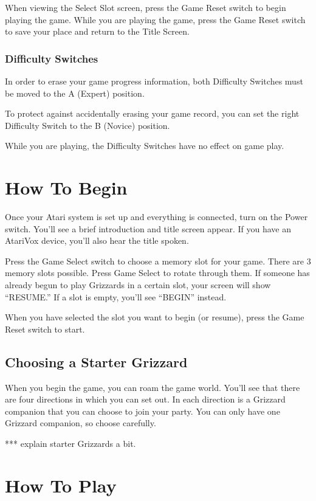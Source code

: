 \documentclass[10pt,twoside,openright]{memoir}
\begin{document}
When viewing  the Select  Slot screen,  press the  Game Reset  switch to
begin playing the  game. While you are playing the  game, press the Game
Reset switch to save your place and return to the Title Screen.

\subsection{Difficulty Switches}

In order to erase your game progress information, both Difficulty
Switches must be moved to the A (Expert) position.

To protect  against accidentally erasing  your game record, you  can set
the right Difficulty Switch to the B (Novice) position.

While  you  are playing,  the  Difficulty  Switches  have no  effect  on
game play. 

\chapter{How To Begin}

Once your Atari system is set up and everything is connected, turn on the
Power switch. You'll see a brief introduction and title screen appear. If
you have an AtariVox device, you'll also hear the title spoken.

Press the Game Select switch to choose a memory slot for your game. There
are 3 memory slots possible. Press Game Select to rotate through them. If
someone has already begun to play Grizzards in a certain slot, your screen
will show ``RESUME.'' If a slot is empty, you'll see ``BEGIN'' instead.

When you have selected the slot you want to begin (or resume), press the
Game Reset switch to start.

\section{Choosing a Starter Grizzard}

When you begin the game, you can roam the game world. You'll see that there
are four directions in which you can set out. In each direction is a
Grizzard companion that you can choose to join your party. You can only have
one Grizzard companion, so choose carefully. 

*** explain starter Grizzards a bit.


\chapter{How To Play}
\end{document}
